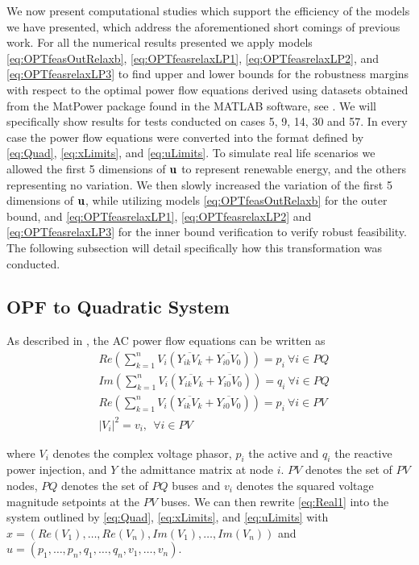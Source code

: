 We now present computational studies which support the efficiency of the models we have presented, which address the aforementioned short comings of previous work. 
For all the numerical results presented we apply models \eqref{eq:OPTfeasOutRelaxb}, \eqref{eq:OPTfeasrelaxLP1}, \eqref{eq:OPTfeasrelaxLP2}, and \eqref{eq:OPTfeasrelaxLP3} to find upper and lower bounds for the robustness margins with respect to the optimal power flow equations derived using datasets obtained from the MatPower package found in the MATLAB software, see \cite{matpower}. 
We will specifically show results for tests conducted on cases 5, 9, 14, 30 and 57. 
In every case the power flow equations were converted into the format defined by \eqref{eq:Quad}, \eqref{eq:xLimits}, and \eqref{eq:uLimits}. 
To simulate real life scenarios we allowed the first 5 dimensions of $\bold u$ to represent renewable energy, and the others representing no variation. We then slowly increased the variation of the first 5 dimensions of $\bold u$, while utilizing models \eqref{eq:OPTfeasOutRelaxb} for the outer bound, and \eqref{eq:OPTfeasrelaxLP1}, \eqref{eq:OPTfeasrelaxLP2} and \eqref{eq:OPTfeasrelaxLP3} for the inner bound verification to verify robust feasibility. 
The following subsection will detail specifically how this transformation was conducted.
\subsection{OPF to Quadratic System}
As described in \cite{DjTuritsyn}, the AC power flow equations can be written as 
\begin{align}\label{eq:Real1}
& Re\left(\sum\limits_{k=1}^n V_i\left(\overline{Y_{ik}V_k} + \overline{Y_{i0}V_0}\right)\right) = p_i \ \forall i\in PQ \\
& Im\left(\sum\limits_{k=1}^n V_i\left(\overline{Y_{ik}V_k} + \overline{Y_{i0}V_0}\right)\right) = q_i \ \forall i\in PQ \\
& Re\left(\sum\limits_{k=1}^n V_i\left(\overline{Y_{ik}V_k} + \overline{Y_{i0}V_0}\right)\right) = p_i \ \forall i\in PV \\
& |V_i|^2 = v_i, \  \ \forall i \in PV 
\end{align}

where $V_i$ denotes the complex voltage phasor, $p_i$ the active and $q_i$ the reactive power injection, and $Y$ the admittance matrix at node $i$. $PV$ denotes the set of $PV$ nodes, $PQ$ denotes the set of $PQ$ buses and $v_i$ denotes the squared voltage magnitude setpoints at the $PV$ buses. We can then rewrite \ref{eq:Real1} into the system outlined by \ref{eq:Quad}, \ref{eq:xLimits}, and \ref{eq:uLimits} with 
$x=\left(Re(V_1), \dots, Re(V_n), Im(V_1),\dots , Im(V_n)\right)$ and $u=\left(p_1, \dots, p_n, q_1, \dots, q_n, v_1, \dots, v_n\right)$. 


